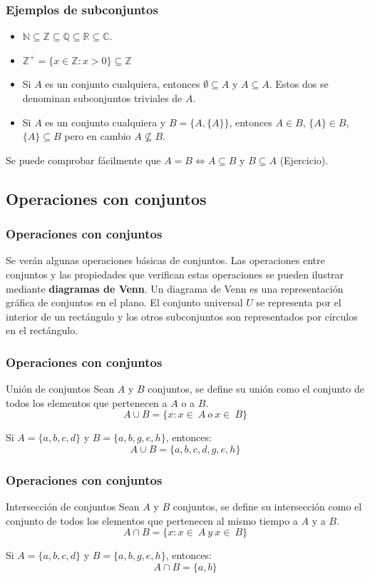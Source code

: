 \documentclass{beamer}
\begin{document}
\begin{frame}
\frametitle{Ejemplos de subconjuntos}
\begin{itemize}
\item $\mathbb N \subseteq \mathbb Z \subseteq \mathbb Q\subseteq \mathbb R\subseteq \mathbb C$.
\item $\mathbb Z^{+} = \{x\in\mathbb Z: x>0\} \subseteq \mathbb Z$
\item Si $A$ es un conjunto cualquiera, entonces $\emptyset\subseteq A$ y $A\subseteq A$. Estos dos se denominan subconjuntos triviales de $A$.
\item Si $A$ es un conjunto cualquiera y $B=\{A,\{A\}\}$, entonces $A\in B$, $\{A\}\in B$, $\{A\}\subseteq B$ pero en cambio $A\not\subseteq B$.
\end{itemize}
Se puede comprobar f\'acilmente que $A=B\Longleftrightarrow A\subseteq B$ y $B\subseteq A$ (Ejercicio).
\end{frame}

\subsection{Operaciones con conjuntos}


\begin{frame}
\frametitle{Operaciones con conjuntos}
Se ver\'an algunas operaciones b\'asicas de conjuntos. Las operaciones entre conjuntos y las propiedades que verifican estas operaciones se pueden ilustrar mediante \textbf{diagramas de Venn}. Un diagrama de Venn es una representaci\'on gr\'afica de conjuntos en el plano. El conjunto universal $U$ se representa por el interior de un rect\'angulo y los otros subconjuntos son representados por c\'irculos en el rect\'angulo.
\end{frame}


\begin{frame}
\frametitle{Operaciones con conjuntos}
\begin{block}{Uni\'on de conjuntos}
Sean $A$ y $B$ conjuntos, se define su uni\'on como el conjunto de todos los elementos que pertenecen a $A$ o a $B$.
\[A\cup B = \{x:x\in\ A\ o \ x\in\ B\}\]
\end{block}
Si $A=\{a,b,c,d\}$ y $B = \{a,b,g,e,h\}$, entonces:
\[A\cup B = \{ a,b,c,d,g,e,h\}\]
\end{frame}

\begin{frame}
\frametitle{Operaciones con conjuntos}
\begin{block}{Intersecci\'on de conjuntos}
Sean $A$ y $B$ conjuntos, se define su intersecci\'on como el conjunto de todos los elementos que pertenecen al mismo tiempo a $A$ y a $B$.
\[A\cap B = \{x:x\in\ A\ y \ x\in\ B\}\]
\end{block}
Si $A=\{a,b,c,d\}$ y $B = \{a,b,g,e,h\}$, entonces:
\[A\cap B = \{ a, b\}\]
\end{frame}
\end{document}
